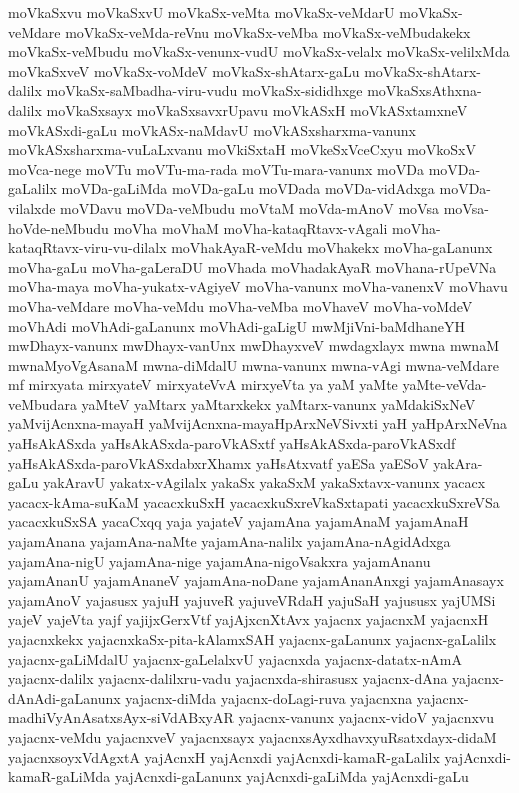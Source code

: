 {moVkaSxvu
moVkaSxvU
moVkaSx-veMta
moVkaSx-veMdarU
moVkaSx-veMdare
moVkaSx-veMda-reVnu
moVkaSx-veMba
moVkaSx-veMbudakekx
moVkaSx-veMbudu
moVkaSx-venunx-vudU
moVkaSx-velalx
moVkaSx-velilxMda
moVkaSxveV
moVkaSx-voMdeV
moVkaSx-shAtarx-gaLu
moVkaSx-shAtarx-dalilx
moVkaSx-saMbadha-viru-vudu
moVkaSx-sididhxge
moVkaSxsAthxna-dalilx
moVkaSxsayx
moVkaSxsavxrUpavu
moVkASxH
moVkASxtamxneV
moVkASxdi-gaLu
moVkASx-naMdavU
moVkASxsharxma-vanunx
moVkASxsharxma-vuLaLxvanu
moVkiSxtaH
moVkeSxVceCxyu
moVkoSxV
moVca-nege
moVTu
moVTu-ma-rada
moVTu-mara-vanunx
moVDa
moVDa-gaLalilx
moVDa-gaLiMda
moVDa-gaLu
moVDada
moVDa-vidAdxga
moVDa-vilalxde
moVDavu
moVDa-veMbudu
moVtaM
moVda-mAnoV
moVsa
moVsa-hoVde-neMbudu
moVha
moVhaM
moVha-kataqRtavx-vAgali
moVha-kataqRtavx-viru-vu-dilalx
moVhakAyaR-veMdu
moVhakekx
moVha-gaLanunx
moVha-gaLu
moVha-gaLeraDU
moVhada
moVhadakAyaR
moVhana-rUpeVNa
moVha-maya
moVha-yukatx-vAgiyeV
moVha-vanunx
moVha-vanenxV
moVhavu
moVha-veMdare
moVha-veMdu
moVha-veMba
moVhaveV
moVha-voMdeV
moVhAdi
moVhAdi-gaLanunx
moVhAdi-gaLigU
mwMjiVni-baMdhaneYH
mwDhayx-vanunx
mwDhayx-vanUnx
mwDhayxveV
mwdagxlayx
mwna
mwnaM
mwnaMyoVgAsanaM
mwna-diMdalU
mwna-vanunx
mwna-vAgi
mwna-veMdare
mf
mirxyata
mirxyateV
mirxyateVvA
mirxyeVta
ya
yaM
yaMte
yaMte-veVda-veMbudara
yaMteV
yaMtarx
yaMtarxkekx
yaMtarx-vanunx
yaMdakiSxNeV
yaMvijAcnxna-mayaH
yaMvijAcnxna-mayaHpArxNeVSivxti
yaH
yaHpArxNeVna
yaHsAkASxda
yaHsAkASxda-paroVkASxtf
yaHsAkASxda-paroVkASxdf
yaHsAkASxda-paroVkASxdabxrXhamx
yaHsAtxvatf
yaESa
yaESoV
yakAra-gaLu
yakAravU
yakatx-vAgilalx
yakaSx
yakaSxM
yakaSxtavx-vanunx
yacacx
yacacx-kAma-suKaM
yacacxkuSxH
yacacxkuSxreVkaSxtapati
yacacxkuSxreVSa
yacacxkuSxSA
yacaCxqq
yaja
yajateV
yajamAna
yajamAnaM
yajamAnaH
yajamAnana
yajamAna-naMte
yajamAna-nalilx
yajamAna-nAgidAdxga
yajamAna-nigU
yajamAna-nige
yajamAna-nigoVsakxra
yajamAnanu
yajamAnanU
yajamAnaneV
yajamAna-noDane
yajamAnanAnxgi
yajamAnasayx
yajamAnoV
yajasusx
yajuH
yajuveR
yajuveVRdaH
yajuSaH
yajususx
yajUMSi
yajeV
yajeVta
yajf
yajijxGerxVtf
yajAjxcnXtAvx
yajacnx
yajacnxM
yajacnxH
yajacnxkekx
yajacnxkaSx-pita-kAlamxSAH
yajacnx-gaLanunx
yajacnx-gaLalilx
yajacnx-gaLiMdalU
yajacnx-gaLelalxvU
yajacnxda
yajacnx-datatx-nAmA
yajacnx-dalilx
yajacnx-dalilxru-vadu
yajacnxda-shirasusx
yajacnx-dAna
yajacnx-dAnAdi-gaLanunx
yajacnx-diMda
yajacnx-doLagi-ruva
yajacnxna
yajacnx-madhiVyAnAsatxsAyx-siVdABxyAR
yajacnx-vanunx
yajacnx-vidoV
yajacnxvu
yajacnx-veMdu
yajacnxveV
yajacnxsayx
yajacnxsAyxdhavxyuRsatxdayx-didaM
yajacnxsoyxVdAgxtA
yajAcnxH
yajAcnxdi
yajAcnxdi-kamaR-gaLalilx
yajAcnxdi-kamaR-gaLiMda
yajAcnxdi-gaLanunx
yajAcnxdi-gaLiMda
yajAcnxdi-gaLu
}
